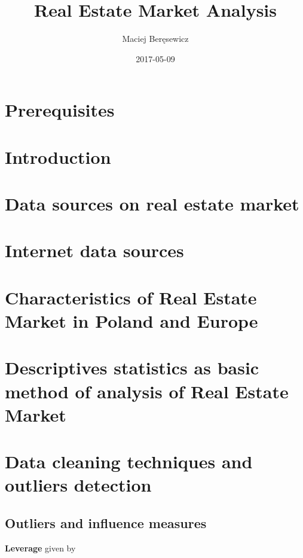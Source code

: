\documentclass[]{book}
\title{Real Estate Market Analysis}
\author{Maciej Beręsewicz}
\date{2017-05-09}
\begin{document}
\maketitle

{
\setcounter{tocdepth}{1}
\tableofcontents
}
\chapter{Prerequisites}\label{prerequisites}

\chapter{Introduction}\label{intro}

\chapter{Data sources on real estate market}\label{data-sources}

\chapter{Internet data sources}\label{internet-data-sources}

\chapter{Characteristics of Real Estate Market in Poland and
Europe}\label{characteristics-of-real-estate-market-in-poland-and-europe}

\chapter{Descriptives statistics as basic method of analysis of Real
Estate
Market}\label{descriptives-statistics-as-basic-method-of-analysis-of-real-estate-market}

\chapter{Data cleaning techniques and outliers
detection}\label{data-cleaning-techniques-and-outliers-detection}

\section{Outliers and influence
measures}\label{outliers-and-influence-measures}

\textbf{Leverage} given by
\end{document}

